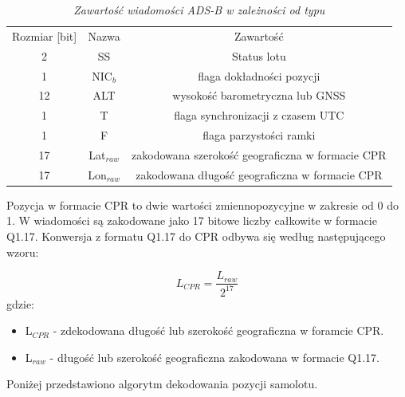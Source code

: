 \documentclass[eng,printmode]{mgr}
\begin{document}
\begin{table}[htb]
\def\arraystretch{1.3}%
\caption{\textit{ Zawartość wiadomości ADS-B w zależności od typu}}
\label{tab:adsb}
  \centering
  \def\arraystretch{1.3}%
  \begin{tabular}{|c|c|c|}
  \hline
  
  \multicolumn{1}{|c|}{Rozmiar [bit]} & \multicolumn{1}{c|}{Nazwa} & \multicolumn{1}{c|}{Zawartość} \\\cline{1-3}
  \multicolumn{1}{|c|}{2} & \multicolumn{1}{c|}{SS} & \multicolumn{1}{c|}{Status lotu}\\\cline{1-3}
  \multicolumn{1}{|c|}{1} & \multicolumn{1}{c|}{NIC$_b$} & \multicolumn{1}{c|}{flaga dokładności pozycji}\\\cline{1-3}
  \multicolumn{1}{|c|}{12} & \multicolumn{1}{c|}{ALT} & \multicolumn{1}{c|}{wysokość barometryczna lub GNSS}\\\cline{1-3}
  \multicolumn{1}{|c|}{1} & \multicolumn{1}{c|}{T} & \multicolumn{1}{c|}{flaga synchronizacji z czasem UTC}\\\cline{1-3}
  \multicolumn{1}{|c|}{1} & \multicolumn{1}{c|}{F} & \multicolumn{1}{c|}{flaga parzystości ramki}\\\cline{1-3}
  \multicolumn{1}{|c|}{17} & \multicolumn{1}{c|}{Lat$_{raw}$} & \multicolumn{1}{c|}{zakodowana szerokość geograficzna w formacie CPR}\\\cline{1-3}
  \multicolumn{1}{|c|}{17} & \multicolumn{1}{c|}{Lon$_{raw}$} & \multicolumn{1}{c|}{zakodowana długość geograficzna w formacie CPR}\\\cline{1-3}   
 \end{tabular}
\end{table}
\vskip 0.5cm
Pozycja w formacie CPR to dwie wartości zmiennopozycyjne w zakresie od 0 do 1. W wiadomości są zakodowane jako 17 bitowe liczby całkowite w formacie Q1.17. Konwersja z formatu Q1.17 do CPR odbywa się według następującego wzoru:
\newpage

\begin{equation}
L_{CPR} = \frac{L_{raw}}{2^{17}}
\end{equation}
gdzie:
\begin{itemize}
\item L$_{CPR}$ - zdekodowana długość lub szerokość geograficzna w foramcie CPR.
\item L$_{raw}$ - długość lub szerokość geograficzna zakodowana w formacie Q1.17.
\end{itemize}
\vskip 0.5cm
\noindent
Poniżej przedstawiono algorytm dekodowania pozycji samolotu.
\\
\end{document}
